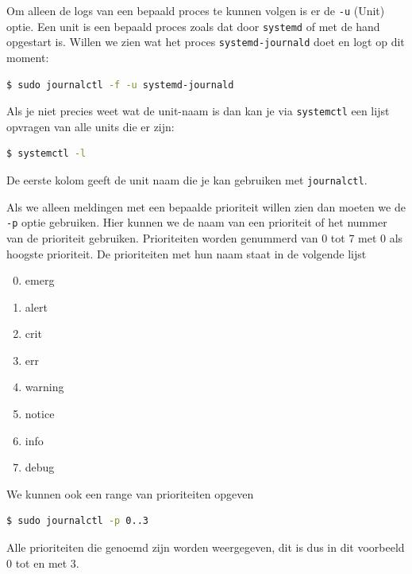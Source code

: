Om alleen de logs van een bepaald proces te kunnen volgen is er de \texttt{-u} (Unit) optie. Een unit is een bepaald proces zoals dat door \texttt{systemd} of met de hand opgestart is. Willen we zien wat het proces \texttt{systemd-journald} doet en logt op dit moment:
\begin{lstlisting}[language=bash]
$ sudo journalctl -f -u systemd-journald
\end{lstlisting}

Als je niet precies weet wat de unit-naam is dan kan je via \texttt{systemctl} een lijst opvragen van alle units die er zijn:
\begin{lstlisting}[language=bash]
$ systemctl -l
\end{lstlisting}
De eerste kolom geeft de unit naam die je kan gebruiken met \texttt{journalctl}.

Als we alleen meldingen met een bepaalde prioriteit willen zien dan moeten we de \texttt{-p} optie gebruiken. Hier kunnen we de naam van een prioriteit of het nummer van de prioriteit gebruiken. Prioriteiten worden genummerd van 0 tot 7 met 0 als hoogste prioriteit. De prioriteiten met hun naam staat in de volgende lijst

\begin{enumerate}
  \setcounter{enumi}{-1}
  \item emerg
  \item alert
  \item crit
  \item err
  \item warning
  \item notice
  \item info
  \item debug
\end{enumerate}

We kunnen ook een range van prioriteiten opgeven
\begin{lstlisting}[language=bash]
$ sudo journalctl -p 0..3
\end{lstlisting}
Alle prioriteiten die genoemd zijn worden weergegeven, dit is dus in dit voorbeeld 0 tot en met 3.


